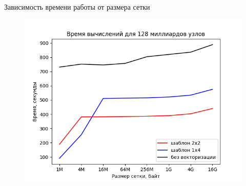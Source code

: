 \documentclass[presentation,18pt]{beamer}
\begin{document}
\begin{frame}[t]
\begin{columns}
		\begin{alertblock}{Зависимость времени работы от размера сетки}
			\begin{figure}
				\includegraphics[width=\textwidth]{img/GraphVector.png}
			\end{figure}
		\end{alertblock}

	\end{columns}
\end{frame}
\end{document}
